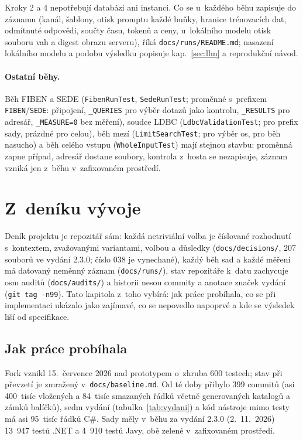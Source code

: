 \documentclass{article}
\begin{document}
Kroky 2 a 4 nepotřebují databázi ani instanci. Co se u~každého běhu zapisuje do záznamu (kanál, šablony, otisk promptu každé buňky, hranice trénovacích dat, odmítnuté odpovědi, součty času, tokenů a ceny, u~lokálního modelu otisk souboru vah a digest obrazu serveru), říká \texttt{docs/runs/README.md}; nasazení lokálního modelu a podobu výsledku popisuje kap.~\ref{sec:llm} a reprodukční návod.

\paragraph{Ostatní běhy.} Běh FIBEN a SEDE (\texttt{FibenRunTest}, \texttt{SedeRunTest}; proměnné s~prefixem \texttt{FIBEN}/\texttt{SEDE}: připojení, \texttt{\_QUERIES} pro výběr dotazů jako kontrolu, \texttt{\_RESULTS} pro adresář, \texttt{\_MEASURE=0} bez měření), soudce LDBC (\texttt{LdbcValidationTest};  pro prefix sady, prázdné pro celou), běh mezí (\texttt{LimitSearchTest};  pro výběr os,  pro běh nasucho) a běh celého vstupu (\texttt{WholeInputTest}) mají stejnou stavbu: proměnná zapne případ, adresář dostane soubory, kontrola z~hosta se nezapisuje, záznam vzniká jen z~běhu v~zafixovaném prostředí.
\section{Z~deníku vývoje}\label{sec:denik}

Deník projektu je repozitář sám: každá netriviální volba je číslované rozhodnutí s~kontextem, zvažovanými variantami, volbou a důsledky (\texttt{docs/decisions/}, 207 souborů ve vydání 2.3.0; číslo 038 je vynechané), každý běh sad a každé měření má datovaný neměnný záznam (\texttt{docs/runs/}), stav repozitáře k~datu zachycuje osm auditů (\texttt{docs/audits/}) a historii nesou commity a anotace značek vydání (\texttt{git tag -n99}). Tato kapitola z~toho vybírá: jak práce probíhala, co se při implementaci ukázalo jako zajímavé, co se nepovedlo napoprvé a kde se výsledek liší od specifikace.

\subsection{Jak práce probíhala}

Fork vznikl 15.~července 2026 nad prototypem o~zhruba 600 testech; stav při převzetí je zmražený v~\texttt{docs/baseline.md}. Od té doby přibylo 399 commitů (asi 400~tisíc vložených a 84~tisíc smazaných řádků včetně generovaných katalogů a zámků balíčků), sedm vydání (tabulka~\ref{tab:vydani}) a kód nástroje mimo testy má asi 95~tisíc řádků C\#. Sady měly v~běhu za vydání 2.3.0 (2.~11.~2026) 13~947 testů .NET a 4~910 testů Javy, obě zelené v~zafixovaném prostředí.
\end{document}
